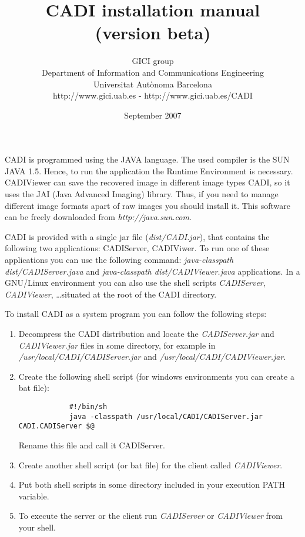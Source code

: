 \documentclass[a4paper,10pt]{article}
\title{CADI installation manual \\ \small (version beta)}
\author{
GICI group \vspace{0.1cm} \\
\small Department of Information and Communications Engineering \\
\small Universitat Aut{\`o}noma Barcelona \\
\small http://www.gici.uab.es  -  http://www.gici.uab.es/CADI \\
}
\date{September 2007}
\begin{document}
\maketitle

	CADI is programmed using the JAVA language. The used compiler is the
	SUN JAVA 1.5. Hence, to run the application the Runtime Environment
	is necessary. CADIViewer can save the recovered image in different
   image types CADI, so it uses 
	the JAI (Java Advanced Imaging) library. Thus, if you need to
	manage different image formats apart of raw images you should
	install it. This software can be freely downloaded from
	\emph{http://java.sun.com}. 

	CADI is provided with a single jar file (\emph{dist/CADI.jar}), that
	contains the following two applications: CADIServer, CADIViwer. To run one
	of these applications you can use the following command: 
	\emph{java-classpath dist/CADIServer.java} and 
	\emph{java-classpath dist/CADIViewer.java}
	applications. In a GNU/Linux environment you can also use the shell
	scripts \emph{CADIServer}, \emph{CADIViewer}, \ldots situated at the
	root of the CADI directory. 

	To install CADI as a system program you can follow the following
	steps: 

	\begin{enumerate}
		\item Decompress the CADI distribution and locate the
		\emph{CADIServer.jar} and	\emph{CADIViewer.jar} files in some directory,
		for example in \emph{/usr/local/CADI/CADIServer.jar} and
		\emph{/usr/local/CADI/CADIViewer.jar}.  
		\item Create the following shell script (for windows
		environments you can create a bat file): 
			\begin{verbatim}
			#!/bin/sh
			java -classpath /usr/local/CADI/CADIServer.jar CADI.CADIServer $@ 
			\end{verbatim}
			Rename this file and call it CADIServer.
		\item Create another shell script (or bat file) for the client
		called \emph{CADIViewer}. 
		\item Put both shell scripts in some directory included in your
		execution PATH variable. 
		\item To execute the server or the client run \emph{CADIServer} or
		\emph{CADIViewer} from your shell. 
	\end{enumerate}
\end{document}

